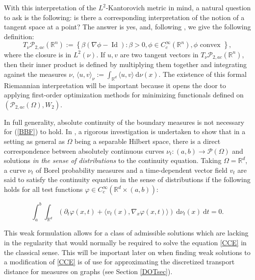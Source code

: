 \documentclass{article}
\DeclareMathOperator*{\Id}{Id}
\newcommand{\R}{\mathbb{R}}
\newcommand{\diff}{\:\mathrm{d}}
\begin{document}
With this interpretation of the \(L^2\)-Kantorovich metric in mind, a natural question to ask is the following: is there a corresponding interpretation of the notion of a tangent space at a point? The answer is yes, and, following \cite{ambrosioGradientFlowsMetric2005}, we give the following definition:
\[T_\nu \mathcal{P}_{2,ac}(\R^n) := \left\{ \beta(\nabla\phi - \Id)  : \beta > 0, \phi \in C_c^\infty(\R^n), \phi \text{ convex }\right\},\]
where the closure is in \(L^2(\nu)\). If \(u,v\) are two tangent vectors in \(T_\nu \mathcal{P}_{2,ac}(\R^n)\), then their inner product is defined by multiplying them together and integrating against the measures \(\nu\), \(\langle u,v\rangle_\nu := \int_{\R^d}\langle u,v\rangle \diff \nu(x)\). The existence of this formal Riemannian interpretation will be important because it opens the door to applying first-order optimization methods for minimizing functionals defined on \((\mathcal{P}_{2,ac}(\Omega), W_2)\).

In full generality, absolute continuity of the boundary measures is not necessary for (\ref{BBF}) to hold. In \cite{ambrosioGradientFlowsMetric2005}, a rigorous investigation is undertaken to show that in a setting as general as \(\Omega\) being a separable Hilbert space, there is a direct correspondence between absolutely continuous curves \(\nu_t:(a,b) \to \mathcal{P}(\Omega)\) and solutions \emph{in the sense of distributions} to the continuity equation. Taking \(\Omega=\R^d\), a curve \(\nu_t\) of Borel probability measures and a time-dependent vector field \(v_t\) are said to satisfy the continuity equation in the sense of distributions if the following holds for all test functions \(\varphi \in C_{c}^\infty(\R^d \times (a,b))\):

\begin{equation*}
  \int_{a}^{b}\int_{\R^d} \left( \partial_t \varphi(x,t) + \langle v_t(x), \nabla_x\varphi(x,t) \rangle \right) \diff \nu_t(x) \diff t = 0.
\end{equation*}

This weak formulation allows for a class of admissible solutions which are lacking in the regularity that would normally be required to solve the equation \eqref{CCE} in the classical sense. This will be important later on when finding weak solutions to a modification of \eqref{CCE} is of use for approximating the discretized transport distance for measures on graphs (see Section \ref{DOTsec}).
\end{document}
